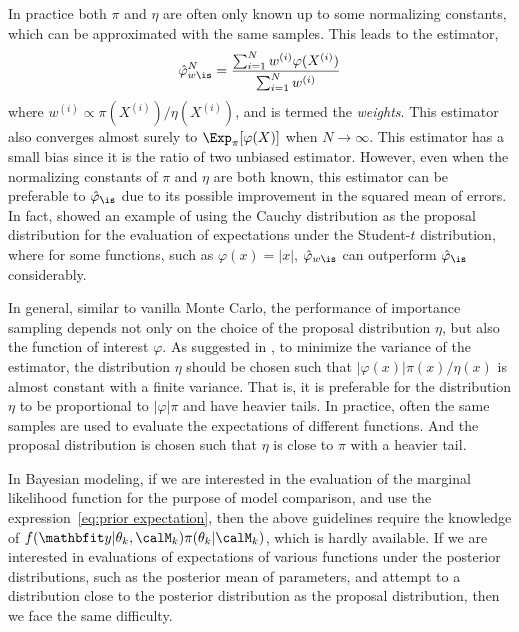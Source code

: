 In practice both $\pi$ and $\eta$ are often only known up to some normalizing
constants, which can be approximated with the same samples. This leads to the
estimator,
\begin{equation}
  \hat\varphi_{w\is}^N
  = \frac{\sum_{i=1}^Nw^{(i)}\varphi(X^{(i)})}{\sum_{i=1}^Nw^{(i)}}
  \label{eq:is unnormalized}
\end{equation}
where $w^{(i)} \propto \pi(X^{(i)})/\eta(X^{(i)})$, and is termed the
\emph{weights}. This estimator also converges almost surely to
$\Exp_{\pi}[\varphi(X)]$ when $N\to\infty$. This estimator has a small
bias since it is the ratio of two unbiased estimator. However, even when the
normalizing constants of $\pi$ and $\eta$ are both known, this estimator can
be preferable to $\hat\varphi_{\is}$ due to its possible improvement in the
squared mean of errors. In fact, \cite{Casella:1998tj} showed an example of
using the Cauchy distribution as the proposal distribution for the evaluation
of expectations under the Student-$t$ distribution, where for some
functions, such as $\varphi(x) = |x|$, $\hat\varphi_{w\is}$ can
outperform $\hat\varphi_{\is}$ considerably.

In general, similar to vanilla Monte Carlo, the performance of importance
sampling depends not only on the choice of the proposal distribution $\eta$,
but also the function of interest $\varphi$. As suggested in
\cite[][sec.~3.3.2]{Robert:2004tn}, to minimize the variance of the estimator,
the distribution $\eta$ should be chosen such that
$|\varphi(x)|\pi(x)/\eta(x)$ is almost constant with a finite variance. That
is, it is preferable for the distribution $\eta$ to be proportional to
$|\varphi|\pi$ and have heavier tails. In practice, often the same samples are
used to evaluate the expectations of different functions. And the proposal
distribution is chosen such that $\eta$ is close to $\pi$ with a heavier tail.

In Bayesian modeling, if we are interested in the evaluation of the marginal
likelihood function for the purpose of model comparison, and use the
expression~\ref{eq:prior expectation}, then the above guidelines require the
knowledge of $f(\data|\theta_k,\calM_k)\pi(\theta_k|\calM_k)$, which is hardly
available. If we are interested in evaluations of expectations of various
functions under the posterior distributions, such as the posterior mean of
parameters, and attempt to a distribution close to the posterior distribution
as the proposal distribution, then we face the same difficulty.

